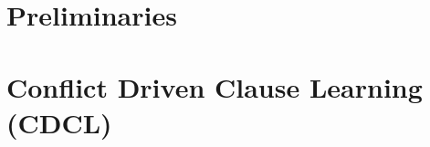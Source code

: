\documentclass[12pt,openany]{book}
\begin{document}

\tableofcontents
\newpage



\chapter{Preliminaries}


\chapter{Conflict Driven Clause Learning (CDCL)}



\newpage

\end{document}
